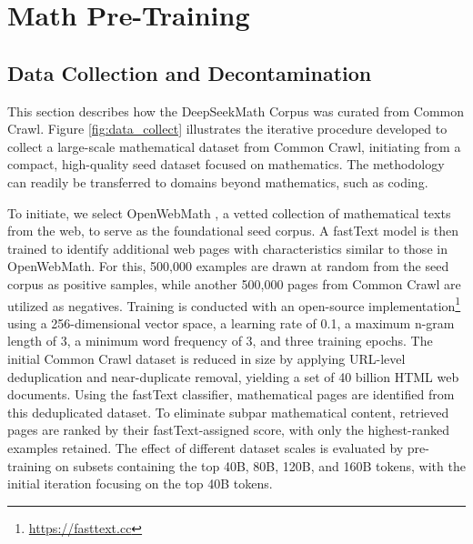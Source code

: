 \section{Math Pre-Training}

\subsection{Data Collection and Decontamination} This section describes how the DeepSeekMath Corpus was curated from Common Crawl. Figure \ref{fig:data_collect} illustrates the iterative procedure developed to collect a large-scale mathematical dataset from Common Crawl, initiating from a compact, high-quality seed dataset focused on mathematics. The methodology can readily be transferred to domains beyond mathematics, such as coding.

To initiate, we select OpenWebMath \citep{openwebmath}, a vetted collection of mathematical texts from the web, to serve as the foundational seed corpus. A fastText model \citep{joulin2016fasttext} is then trained to identify additional web pages with characteristics similar to those in OpenWebMath. For this, 500,000 examples are drawn at random from the seed corpus as positive samples, while another 500,000 pages from Common Crawl are utilized as negatives. Training is conducted with an open-source implementation\footnote{\url{https://fasttext.cc}} using a 256-dimensional vector space, a learning rate of 0.1, a maximum n-gram length of 3, a minimum word frequency of 3, and three training epochs. The initial Common Crawl dataset is reduced in size by applying URL-level deduplication and near-duplicate removal, yielding a set of 40 billion HTML web documents. Using the fastText classifier, mathematical pages are identified from this deduplicated dataset. To eliminate subpar mathematical content, retrieved pages are ranked by their fastText-assigned score, with only the highest-ranked examples retained. The effect of different dataset scales is evaluated by pre-training on subsets containing the top 40B, 80B, 120B, and 160B tokens, with the initial iteration focusing on the top 40B tokens.


